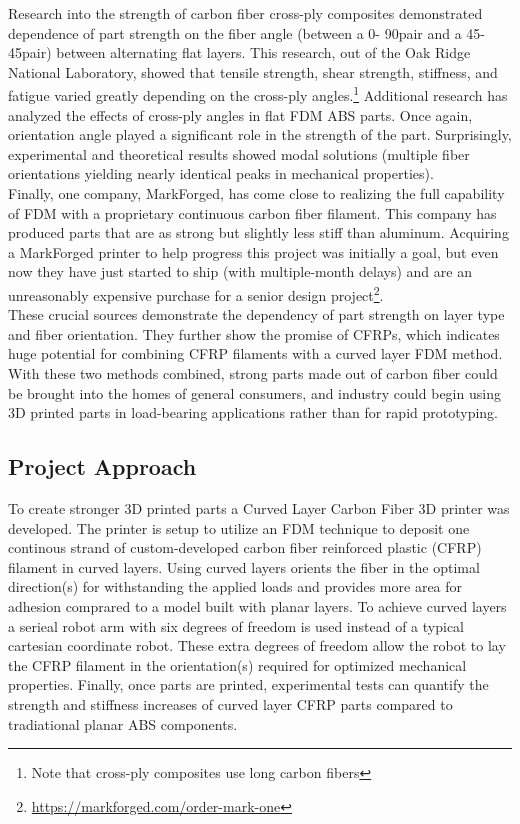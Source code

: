 Research into the strength of carbon fiber cross-ply composites demonstrated dependence of part strength on the fiber angle (between a 0\degree - 90\degree pair and a 45\degree - 45\degree pair) between alternating flat layers. This research, out of the Oak Ridge National Laboratory, showed that tensile strength, shear strength, stiffness, and fatigue varied greatly depending on the cross-ply angles.\footnote{Note that cross-ply composites use long carbon fibers}\cite{ornl} Additional research has analyzed the effects of cross-ply angles \cite{cantilever} in flat FDM ABS parts. Once again, orientation angle played a significant role in the strength of the part. Surprisingly, experimental and theoretical results showed modal solutions (multiple fiber orientations yielding nearly identical peaks in mechanical properties).\\

Finally, one company, MarkForged\cite{markforged}, has come close to realizing the full capability of FDM with a proprietary continuous carbon fiber filament. This company has produced parts that are as strong but slightly less stiff than aluminum. Acquiring a MarkForged printer to help progress this project was initially a goal, but even now they have just started to ship (with multiple-month delays) and are an unreasonably expensive purchase for a senior design project\footnote{\url{https://markforged.com/order-mark-one}}.\\

These crucial sources demonstrate the dependency of part strength on layer type and fiber orientation. They further show the promise of CFRPs, which indicates huge potential for combining CFRP filaments with a curved layer FDM method. With these two methods combined, strong parts made out of carbon fiber could be brought into the homes of general consumers, and industry could begin using 3D printed parts in load-bearing applications rather than for rapid prototyping.\\

\subsection{Project Approach}

\indent

To create stronger 3D printed parts a Curved Layer Carbon Fiber 3D printer was developed. The printer is setup to utilize an FDM technique to deposit one continous strand of custom-developed carbon fiber reinforced plastic (CFRP) filament in curved layers. Using curved layers orients the fiber in the optimal direction(s) for withstanding the applied loads and provides more area for adhesion comprared to a model built with planar layers. To achieve curved layers a serieal robot arm with six degrees of freedom is used instead of a typical cartesian coordinate robot. These extra degrees of freedom allow the robot to lay the CFRP filament in the orientation(s) required for optimized mechanical properties. Finally, once parts are printed, experimental tests can quantify the strength and stiffness increases of curved layer CFRP parts compared to tradiational planar ABS components.\\


